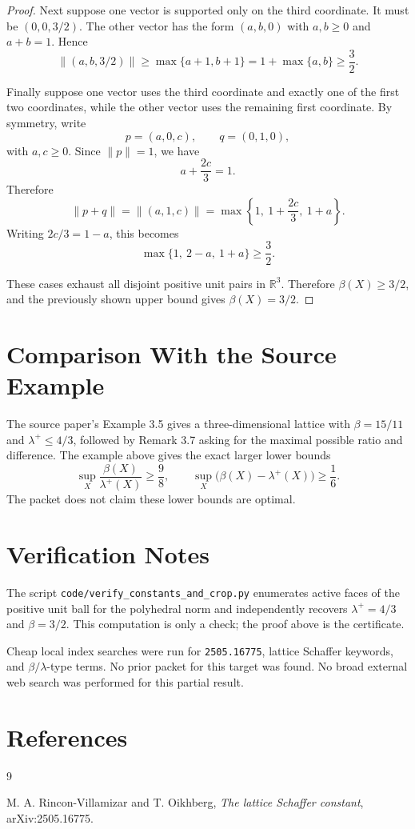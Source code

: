 \documentclass[11pt]{article}
\newcommand{\R}{\mathbb R}
\newcommand{\lamplus}{\lambda^+}
\begin{document}
\begin{proof}
Next suppose one vector is supported only on the third coordinate.  It must be
\((0,0,3/2)\).  The other vector has the form \((a,b,0)\) with \(a,b\ge0\) and
\(a+b=1\).  Hence
\[
\|(a,b,3/2)\|
\ge \max\{a+1,b+1\}
=1+\max\{a,b\}
\ge \frac32.
\]

Finally suppose one vector uses the third coordinate and exactly one of the
first two coordinates, while the other vector uses the remaining first
coordinate.  By symmetry, write
\[
p=(a,0,c),\qquad q=(0,1,0),
\]
with \(a,c\ge0\).  Since \(\|p\|=1\), we have
\[
a+\frac{2c}{3}=1.
\]
Therefore
\[
\|p+q\|
=\left\|(a,1,c)\right\|
=\max\left\{1,\ 1+\frac{2c}{3},\ 1+a\right\}.
\]
Writing \(2c/3=1-a\), this becomes
\[
\max\{1,\ 2-a,\ 1+a\}\ge \frac32.
\]

These cases exhaust all disjoint positive unit pairs in \(\R^3\).  Therefore
\(\beta(X)\ge 3/2\), and the previously shown upper bound gives
\(\beta(X)=3/2\).
\end{proof}

\section*{Comparison With the Source Example}

The source paper's Example 3.5 gives a three-dimensional lattice with
\(\beta=15/11\) and \(\lamplus\le4/3\), followed by Remark 3.7 asking for the
maximal possible ratio and difference.  The example above gives the exact
larger lower bounds
\[
\sup_X\frac{\beta(X)}{\lamplus(X)}\ge\frac98,
\qquad
\sup_X\bigl(\beta(X)-\lamplus(X)\bigr)\ge\frac16.
\]
The packet does not claim these lower bounds are optimal.

\section*{Verification Notes}

The script \texttt{code/verify\_constants\_and\_crop.py} enumerates active
faces of the positive unit ball for the polyhedral norm and independently
recovers \(\lamplus=4/3\) and \(\beta=3/2\).  This computation is only a
check; the proof above is the certificate.

Cheap local index searches were run for \texttt{2505.16775}, lattice Schaffer
keywords, and \(\beta/\lambda\)-type terms.  No prior packet for this target
was found.  No broad external web search was performed for this partial
result.

\section*{References}

\begin{thebibliography}{9}

M. A. Rincon-Villamizar and T. Oikhberg,
\emph{The lattice Schaffer constant},
arXiv:2505.16775.

\end{thebibliography}
\end{document}
